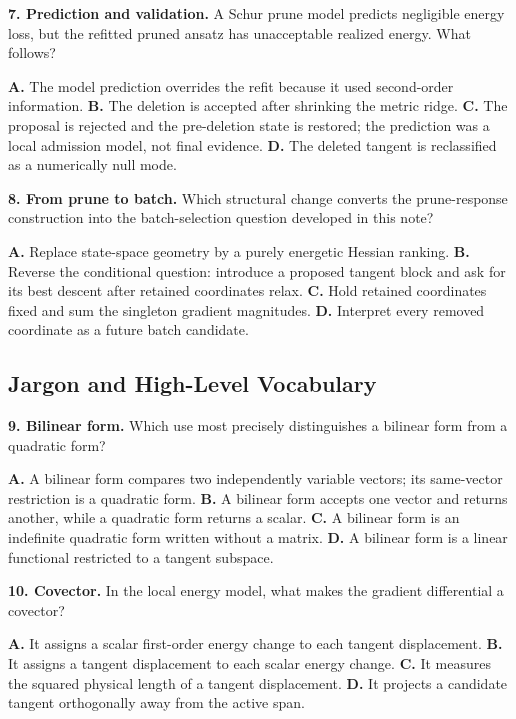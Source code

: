 \documentclass[10pt,twocolumn]{article}
\begin{document}
\textbf{7. Prediction and validation.}
A Schur prune model predicts negligible energy loss, but the refitted pruned
ansatz has unacceptable realized energy. What follows?

\textbf{A.} The model prediction overrides the refit because it used
second-order information.\quad
\textbf{B.} The deletion is accepted after shrinking the metric ridge.\quad
\textbf{C.} The proposal is rejected and the pre-deletion state is restored;
the prediction was a local admission model, not final evidence.\quad
\textbf{D.} The deleted tangent is reclassified as a numerically null mode.

\textbf{8. From prune to batch.}
Which structural change converts the prune-response construction into the
batch-selection question developed in this note?

\textbf{A.} Replace state-space geometry by a purely energetic Hessian ranking.\quad
\textbf{B.} Reverse the conditional question: introduce a proposed tangent
block and ask for its best descent after retained coordinates relax.\quad
\textbf{C.} Hold retained coordinates fixed and sum the singleton gradient
magnitudes.\quad
\textbf{D.} Interpret every removed coordinate as a future batch candidate.

\subsection*{Jargon and High-Level Vocabulary}

\textbf{9. Bilinear form.}
Which use most precisely distinguishes a bilinear form from a quadratic form?

\textbf{A.} A bilinear form compares two independently variable vectors; its
same-vector restriction is a quadratic form. \quad
\textbf{B.} A bilinear form accepts one vector and returns another, while a
quadratic form returns a scalar. \quad
\textbf{C.} A bilinear form is an indefinite quadratic form written without a
matrix. \quad
\textbf{D.} A bilinear form is a linear functional restricted to a tangent
subspace.

\textbf{10. Covector.}
In the local energy model, what makes the gradient differential a covector?

\textbf{A.} It assigns a scalar first-order energy change to each tangent
displacement. \quad
\textbf{B.} It assigns a tangent displacement to each scalar energy change. \quad
\textbf{C.} It measures the squared physical length of a tangent displacement. \quad
\textbf{D.} It projects a candidate tangent orthogonally away from the active
span.
\end{document}
